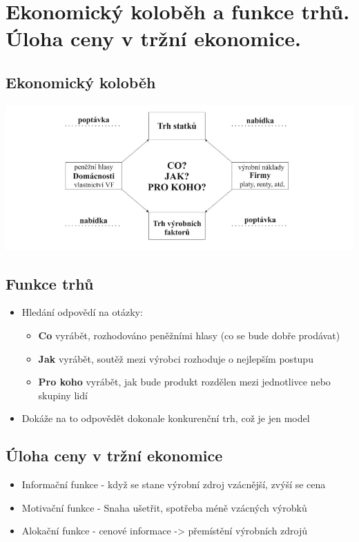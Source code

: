 \clearpage
\section{Ekonomický koloběh a funkce trhů. Úloha ceny v tržní ekonomice.}

\subsection{Ekonomický koloběh}
\includegraphics[width=16cm]{images/04_kolobeh.png}

\subsection{Funkce trhů}
\begin{itemize}
    \item Hledání odpovědí na otázky:
    \begin{itemize}
        \item \textbf{Co} vyrábět, rozhodováno peněžními hlasy (co se bude dobře prodávat)
        \item \textbf{Jak} vyrábět, soutěž mezi výrobci rozhoduje o nejlepším postupu
        \item \textbf{Pro koho} vyrábět, jak bude produkt rozdělen mezi jednotlivce nebo skupiny lidí
    \end{itemize}
    \item Dokáže na to odpovědět dokonale konkurenční trh, což je jen model
\end{itemize}

\subsection{Úloha ceny v tržní ekonomice}
\begin{itemize}
    \item Informační funkce - když se stane výrobní zdroj vzácnější, zvýší se cena
    \item Motivační funkce - Snaha ušetřit, spotřeba méně vzácných výrobků
    \item Alokační funkce - cenové informace -> přemístění výrobních zdrojů
\end{itemize}